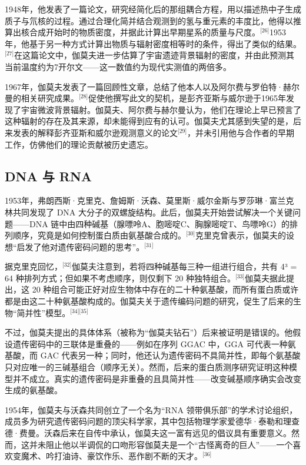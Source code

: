 1948年，他发表了一篇论文，研究经简化后的那组耦合方程，用以描述热中子生成质子与氘核的过程。通过合理化简并结合观测到的氢与重元素的丰度比，他得以推算出核合成开始时的物质密度，并据此计算出早期星系的质量与尺度。\(^\text{[26]}\)1953年，他基于另一种方式计算出物质与辐射密度相等时的条件，得出了类似的结果。\(^\text{[27]}\)在这篇论文中，伽莫夫进一步估算了宇宙遗迹背景辐射的密度，并由此预测其当前温度约为7开尔文——这一数值约为现代实测值的两倍多。

1967年，伽莫夫发表了一篇回顾性文章，总结了他本人以及阿尔费与罗伯特·赫尔曼的相关研究成果。\(^\text{[28]}\)促使他撰写此文的契机，是彭齐亚斯与威尔逊于1965年发现了宇宙微波背景辐射。伽莫夫、阿尔费与赫尔曼认为，他们在理论上早已预言了这种辐射的存在及其来源，却未能得到应有的认可。伽莫夫尤其感到失望的是，后来发表的解释彭齐亚斯和威尔逊观测意义的论文\(^\text{[29]}\)，并未引用他与合作者的早期工作，仿佛他们的理论贡献被历史遗忘。
\subsection{DNA 与 RNA}
1953年，弗朗西斯·克里克、詹姆斯·沃森、莫里斯·威尔金斯与罗莎琳·富兰克林共同发现了 DNA 大分子的双螺旋结构。此后，伽莫夫开始尝试解决一个关键问题——DNA 链中由四种碱基（腺嘌呤A、胞嘧啶C、胸腺嘧啶T、鸟嘌呤G）的排列顺序，究竟是如何控制蛋白质由氨基酸合成的。\(^\text{[30]}\)克里克曾表示，伽莫夫的设想“启发了他对遗传密码问题的思考”。\(^\text{[31]}\)

据克里克回忆，\(^\text{[32]}\)伽莫夫注意到，若将四种碱基每三种一组进行组合，共有 4³ = 64 种排列方式；但如果不考虑顺序，则仅剩下 20 种独特组合。\(^\text{[33]}\)伽莫夫据此提出，这 20 种组合可能正好对应生物体中存在的二十种氨基酸，而所有蛋白质或许都是由这二十种氨基酸构成的。伽莫夫关于遗传编码问题的研究，促生了后来的生物“简并性”模型。\(^\text{[34][35]}\)

不过，伽莫夫提出的具体体系（被称为“伽莫夫钻石”）后来被证明是错误的。他假设遗传密码中的三联体是重叠的——例如在序列 GGAC 中，GGA 可代表一种氨基酸，而 GAC 代表另一种；同时，他还认为遗传密码不具简并性，即每个氨基酸只对应唯一的三碱基组合（顺序无关）。然而，后来的蛋白质测序研究证明这种模型并不成立。真实的遗传密码是非重叠的且具简并性——改变碱基顺序确实会改变生成的氨基酸。

1954年，伽莫夫与沃森共同创立了一个名为“RNA 领带俱乐部”的学术讨论组织，成员多为研究遗传密码问题的顶尖科学家，其中包括物理学家爱德华·泰勒和理查德·费曼。沃森后来在自传中承认，伽莫夫这一富有远见的倡议具有重要意义。然而，这并未阻止他以半调侃的口吻形容伽莫夫是一个“古怪离奇的巨人”——一个喜欢变魔术、吟打油诗、豪饮作乐、恶作剧不断的天才。\(^\text{[36]}\)
